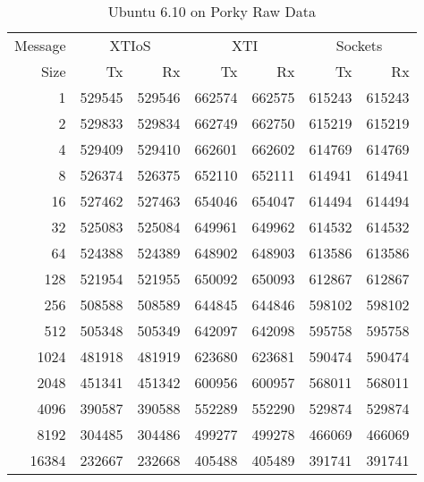 \documentclass[letterpaper,final,notitlepage,twocolumn,10pt,twoside]{article}
\begin{document}
\begin{appendix}
\begin{table}[hbp]
\footnotesize
\begin{center}
\setlength{\tabcolsep}{0.2em}
\setlength{\arraycolsep}{0.2em}
\begin{tabular}{rrrrrrr}\\
Message & \multicolumn{2}{c}{XTIoS} & \multicolumn{2}{c}{XTI} & \multicolumn{2}{c}{Sockets}\\
Size & Tx & Rx & Tx & Rx & Tx & Rx\\
\hline
\hline
1 & 529545 & 529546 & 662574 & 662575 & 615243 & 615243\\
2 & 529833 & 529834 & 662749 & 662750 & 615219 & 615219\\
4 & 529409 & 529410 & 662601 & 662602 & 614769 & 614769\\
8 & 526374 & 526375 & 652110 & 652111 & 614941 & 614941\\
16 & 527462 & 527463 & 654046 & 654047 & 614494 & 614494\\
32 & 525083 & 525084 & 649961 & 649962 & 614532 & 614532\\
64 & 524388 & 524389 & 648902 & 648903 & 613586 & 613586\\
128 & 521954 & 521955 & 650092 & 650093 & 612867 & 612867\\
256 & 508588 & 508589 & 644845 & 644846 & 598102 & 598102\\
512 & 505348 & 505349 & 642097 & 642098 & 595758 & 595758\\
1024 & 481918 & 481919 & 623680 & 623681 & 590474 & 590474\\
2048 & 451341 & 451342 & 600956 & 600957 & 568011 & 568011\\
4096 & 390587 & 390588 & 552289 & 552290 & 529874 & 529874\\
8192 & 304485 & 304486 & 499277 & 499278 & 466069 & 466069\\
16384 & 232667 & 232668 & 405488 & 405489 & 391741 & 391741\\
\hline
\end{tabular}
\end{center}
\normalsize
\caption[Ubuntu 6.10 on Porky Raw Data]{Ubuntu 6.10 on Porky Raw Data}
\label{table:ubuntudata}
\end{table}


\end{appendix}
\end{document}
